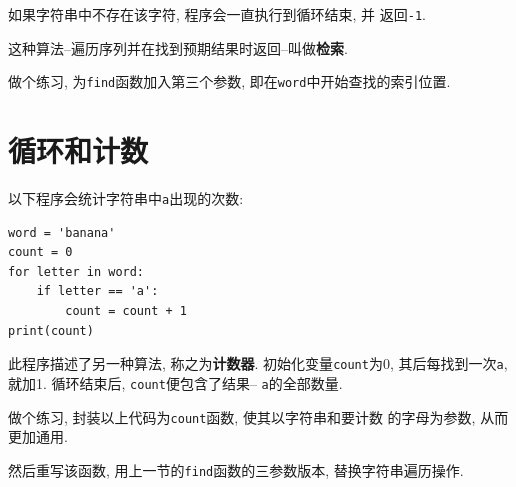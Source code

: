 \documentclass[10pt]{book}
\begin{document}
如果字符串中不存在该字符, 程序会一直执行到循环结束, 并
返回{\tt -1}.

这种算法--遍历序列并在找到预期结果时返回--叫做{\bf 检索}. 

做个练习, 为{\tt find}函数加入第三个参数, 
即在{\tt word}中开始查找的索引位置. 

\section{循环和计数}
\label{counter}
以下程序会统计字符串中{\tt a}出现的次数:

\begin{verbatim}
word = 'banana'
count = 0
for letter in word:
    if letter == 'a':
        count = count + 1
print(count)
\end{verbatim}
%
此程序描述了另一种算法, 称之为{\bf 计数器}.
初始化变量{\tt count}为0, 其后每找到一次{\tt a}, 就加1.
循环结束后,  {\tt count}便包含了结果-- {\tt a}的全部数量.

做个练习, 封装以上代码为{\tt count}函数, 使其以字符串和要计数
的字母为参数, 从而更加通用. 

然后重写该函数, 用上一节的{\tt find}函数的三参数版本, 替换字符串遍历操作. 

\end{document}
